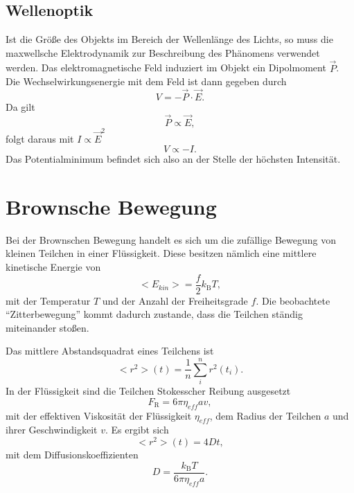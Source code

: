 \subsection{Wellenoptik}

Ist die Größe des Objekts im Bereich der Wellenlänge des Lichts, so muss die maxwellsche Elektrodynamik zur Beschreibung des Phänomens verwendet werden. Das elektromagnetische Feld induziert im Objekt ein Dipolmoment $\vec{P}$. Die Wechselwirkungsenergie mit dem Feld ist dann gegeben durch
\begin{equation}
 V = -\vec{P}\cdot\vec{E}.
\end{equation}
Da gilt
\begin{equation}
 \vec{P} \propto \vec{E},
\end{equation}
folgt daraus mit $I\propto\vec{E}^{2}$
\begin{equation}
 V \propto -I.
\end{equation}
Das Potentialminimum befindet sich also an der Stelle der höchsten Intensität.

\section{Brownsche Bewegung}

Bei der Brownschen Bewegung handelt es sich um die zufällige Bewegung von kleinen Teilchen in einer Flüssigkeit. Diese besitzen nämlich eine mittlere kinetische Energie von 
\begin{equation}
 <E_{kin}> = \frac{f}{2}k_{\textrm{B}}T,
\end{equation}
mit der Temperatur $T$ und der Anzahl der Freiheitsgrade $f$. Die beobachtete ``Zitterbewegung'' kommt dadurch zustande, dass die Teilchen ständig miteinander stoßen.

Das mittlere Abstandsquadrat eines Teilchens ist \cite{Litmap}
\begin{equation}
 <r^{2}>(t) = \frac{1}{n}\sum_{i}^{n}r^{2}(t_{i}).
\end{equation}
In der Flüssigkeit sind die Teilchen Stokesscher Reibung ausgesetzt
\begin{equation}
 F_{\textrm{R}} = 6\pi\eta_{eff}av,
\end{equation}
mit der effektiven Viskosität der Flüssigkeit $\eta_{eff}$, dem Radius der Teilchen $a$ und ihrer Geschwindigkeit $v$. Es ergibt sich
\begin{equation}
 <r^{2}>(t) = 4Dt,
\end{equation}
mit dem Diffusionskoeffizienten
\begin{equation}
 D = \frac{k_{\textrm{B}}T}{6\pi\eta_{eff}a}.
\end{equation}

